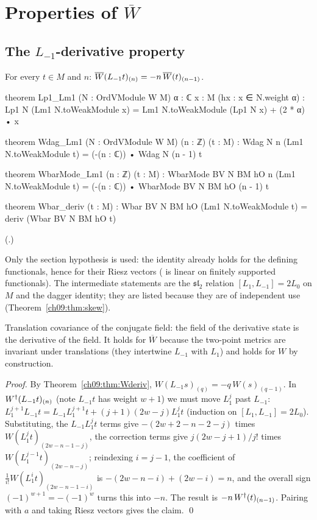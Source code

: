 \section{Properties of \texorpdfstring{$\overline{W}$}{Wbar}}\label{ch09:sec:Wbarprops}

\subsection{The \texorpdfstring{$L_{-1}$}{L-1}-derivative property}

\begin{theorem}[$\chnineWb(L_{-1}t,z)=\partial_z\chnineWb(t,z)$]\label{ch09:thm:Wbarderiv}
For every $t\in M$ and $n$: $\overline{W}(L_{-1}t)_{(n)}=-n\,\overline{W}(t)_{(n-1)}$.
\end{theorem}
\begin{leancode}
theorem Lp1_Lm1 (N : OrdVModule W M) {α : ℂ} {x : M} (hx : x ∈ N.weight α) :
    Lp1 N (Lm1 N.toWeakModule x) = Lm1 N.toWeakModule (Lp1 N x) + (2 * α) • x

theorem Wdag_Lm1 (N : OrdVModule W M) (n : ℤ) (t : M) :
    Wdag N n (Lm1 N.toWeakModule t) = (-(n : ℂ)) • Wdag N (n - 1) t

theorem WbarMode_Lm1 (n : ℤ) (t : M) :
    WbarMode BV N BM hO n (Lm1 N.toWeakModule t) = (-(n : ℂ)) • WbarMode BV N BM hO (n - 1) t

theorem Wbar_deriv (t : M) :
    Wbar BV N BM hO (Lm1 N.toWeakModule t) = deriv (Wbar BV N BM hO t)
\end{leancode}
(.)
\begin{dictionary}
Only the section hypothesis  is used: the identity already holds for the defining
functionals, hence for their Riesz vectors ( is linear on finitely supported
functionals). The intermediate statements are the $\mathfrak{sl}_2$ relation $[L_1,L_{-1}]=2L_0$ on
$M$ and the dagger identity; they are listed because they are of independent use (Theorem~\ref{ch09:thm:skew}).
\end{dictionary}
\begin{physics}
Translation covariance of the conjugate field: the field of the derivative state is the derivative of the field. It holds for $\overline W$ because the two-point metrics are invariant under translations (they intertwine $L_{-1}$ with $L_1$) and holds for $W$ by construction.
\end{physics}

\noindent\emph{Proof.} By Theorem~\ref{ch09:thm:Wderiv}, $W(L_{-1}s)_{(q)}=-q\,W(s)_{(q-1)}$. In
$W^{\dagger}(L_{-1}t)_{(n)}$ (note $L_{-1}t$ has weight $w+1$) we must move $L_1^j$ past $L_{-1}$:
$L_1^{j+1}L_{-1}t=L_{-1}L_1^{j+1}t+(j+1)(2w-j)L_1^jt$ (induction on $[L_1,L_{-1}]=2L_0$). Substituting,
the $L_{-1}L_1^{j}t$ terms give $-(2w+2-n-2-j)$ times $W(L_1^jt)_{(2w-n-1-j)}$, the correction terms
give $j(2w-j+1)/j!$ times $W(L_1^{j-1}t)_{(2w-n-j)}$; reindexing $i=j-1$, the coefficient of
$\frac1{i!}W(L_1^it)_{(2w-n-1-i)}$ is $-(2w-n-i)+(2w-i)=n$, and the overall sign
$(-1)^{w+1}=-(-1)^w$ turns this into $-n$. The result is
$-n\,W^{\dagger}(t)_{(n-1)}$. Pairing with $a$ and taking Riesz vectors gives the claim. \qed

